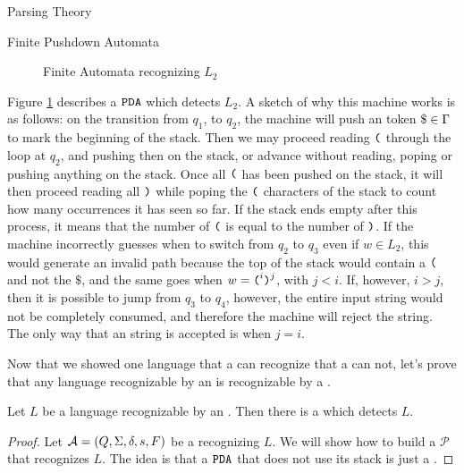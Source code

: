 \begin{section}{Parsing Theory}
\begin{subsection}{Finite Pushdown Automata}
\begin{figure}

\caption{Finite Automata recognizing $L_2$}
\label{fig:pda_l2}
\end{figure}

Figure \ref{fig:pda_l2} describes a $\texttt{PDA}$ which detects $L_2$.
A sketch of why this machine works is as follows: on the transition
from $q_1$, to $q_2$, the machine will push an token $\$ \in \Gamma$ to mark the
beginning of the stack. Then we may proceed reading $\texttt{(}$ through the loop
at $q_2$, and pushing then on the stack, or advance without reading, poping or
pushing anything on the stack.  Once all $\texttt{(}$ has been pushed on the
stack, it will then proceed reading all $\texttt{)}$ while poping the $\texttt{(}$
characters of the stack to count how many occurrences it has seen so far.
If the stack ends empty after this process, it means that the number of $\texttt{(}$
is equal to the number of $\texttt{)}$. If the machine incorrectly guesses when to switch
from $q_2$ to $q_3$ even if $w \in L_2$, this would generate an invalid path
because the top of the stack would contain a $\texttt{(}$ and not the $\$$, and
the same goes when $w = \texttt{(}^i\texttt{)}^j$, with $j < i$. If, however, $i >
j$, then it is possible to jump from $q_3$ to $q_4$, however, the entire input string
would not be completely consumed, and therefore the machine will reject the
string. The only way that an string is accepted is when $j = i$.

Now that we showed one language that a  can recognize that a
 can not, let's prove that any language recognizable by an
 is recognizable by a .

\begin{theorem}
Let $L$ be a language recognizable by an . Then there is a 
which detects $L$.
\end{theorem}
\begin{proof}
	Let $\mathcal{A} = (Q, \Sigma, \delta, s, F)$ be a  recognizing $L$.
We will show how to build a  $\mathcal{P}$ that recognizes $L$.
The idea is that a $\texttt{PDA}$ that does not use its stack is just a .


\end{proof}
\end{subsection}
\end{section}
